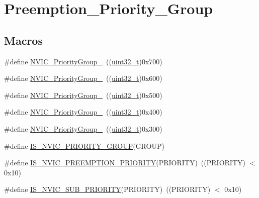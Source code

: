 \hypertarget{group___preemption___priority___group}{}\section{Preemption\+\_\+\+Priority\+\_\+\+Group}
\label{group___preemption___priority___group}
\subsection*{Macros}
\begin{DoxyCompactItemize}
\item 
\#define \hyperlink{group___preemption___priority___group_gaeac0cf537f65d17bc19aee2410b2b60e}{N\+V\+I\+C\+\_\+\+Priority\+Group\+\_}~((\hyperlink{_p_e___types_8h_a33594304e786b158f3fb30289278f5af}{uint32\+\_\+t})0x700)
\item 
\#define \hyperlink{group___preemption___priority___group_ga89bf0bf9e70f1a372a541b1b8d7493aa}{N\+V\+I\+C\+\_\+\+Priority\+Group\+\_}~((\hyperlink{_p_e___types_8h_a33594304e786b158f3fb30289278f5af}{uint32\+\_\+t})0x600)
\item 
\#define \hyperlink{group___preemption___priority___group_ga505002e8b76aef65499ca371e40ec8b4}{N\+V\+I\+C\+\_\+\+Priority\+Group\+\_}~((\hyperlink{_p_e___types_8h_a33594304e786b158f3fb30289278f5af}{uint32\+\_\+t})0x500)
\item 
\#define \hyperlink{group___preemption___priority___group_ga49bdbee77d4a70339d63c80462d49b4d}{N\+V\+I\+C\+\_\+\+Priority\+Group\+\_}~((\hyperlink{_p_e___types_8h_a33594304e786b158f3fb30289278f5af}{uint32\+\_\+t})0x400)
\item 
\#define \hyperlink{group___preemption___priority___group_gaf9020c585da2a299328f0b06dee391a2}{N\+V\+I\+C\+\_\+\+Priority\+Group\+\_}~((\hyperlink{_p_e___types_8h_a33594304e786b158f3fb30289278f5af}{uint32\+\_\+t})0x300)
\item 
\#define \hyperlink{group___preemption___priority___group_ga6569304a39fe4f91bd59b6a586c8ede9}{I\+S\+\_\+\+N\+V\+I\+C\+\_\+\+P\+R\+I\+O\+R\+I\+T\+Y\+\_\+\+G\+R\+O\+UP}(G\+R\+O\+UP)
\item 
\#define \hyperlink{group___preemption___priority___group_gaf30fd8f5960c2e28a772d8f16bb156dd}{I\+S\+\_\+\+N\+V\+I\+C\+\_\+\+P\+R\+E\+E\+M\+P\+T\+I\+O\+N\+\_\+\+P\+R\+I\+O\+R\+I\+TY}(P\+R\+I\+O\+R\+I\+TY)~((P\+R\+I\+O\+R\+I\+TY) $<$ 0x10)
\item 
\#define \hyperlink{group___preemption___priority___group_ga010705bc997dcff935b965b372cba61d}{I\+S\+\_\+\+N\+V\+I\+C\+\_\+\+S\+U\+B\+\_\+\+P\+R\+I\+O\+R\+I\+TY}(P\+R\+I\+O\+R\+I\+TY)~((P\+R\+I\+O\+R\+I\+TY) $<$ 0x10)

\end{DoxyCompactItemize}
